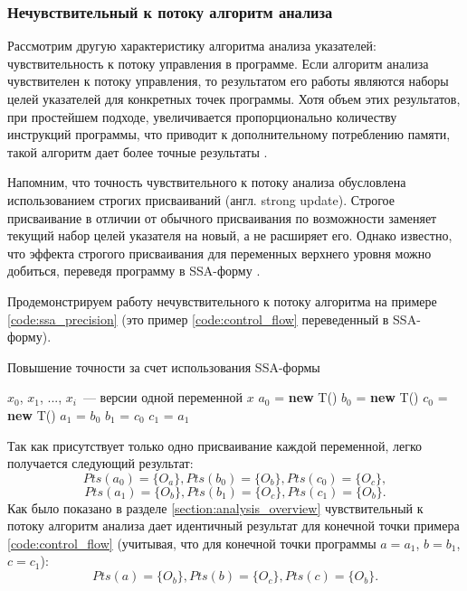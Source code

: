 \documentclass[14pt,titlepage]{extarticle}
\newcommand{\NEW}{\textbf{new }}
\newcommand{\eng}[1]{{\English#1}}
\begin{document}
    \subsubsection{Нечувствительный к потоку алгоритм анализа}
      \label{section:flow_sensetive_analysis}

      Рассмотрим другую характеристику алгоритма анализа указателей:
      чувствительность к потоку управления в программе.
      Если алгоритм анализа чувствителен к потоку управления, то результатом
      его работы являются наборы целей указателей для конкретных точек
      программы.
      Хотя объем этих результатов, при простейшем подходе, увеличивается
      пропорционально количеству инструкций программы, что приводит к
      дополнительному потреблению памяти, такой алгоритм дает более точные
      результаты \cite[с.~57]{hind_pointer_analysis_not_solved_yet}.

      Напомним, что точность чувствительного к потоку анализа обусловлена
      использованием строгих присваиваний (англ. \eng{strong update}).
      Строгое присваивание в отличии от обычного присваивания по возможности
      заменяет текущий набор целей указателя на новый, а не расширяет его.
      Однако известно, что эффекта строгого присваивания для переменных
      верхнего уровня можно добиться, переведя программу в SSA-форму
      \cite{points_to_with_efficient_strong_updates}.

      Продемонстрируем работу нечувствительного к потоку алгоритма на примере
      \ref{code:ssa_precision} (это пример \ref{code:control_flow} переведенный
      в SSA-форму).
      \begin{algorithm}
        \caption{Повышение точности за счет использования SSA-формы}
        \label{code:ssa_precision}
        \begin{algorithmic}[1]
          \REQUIRE $x_0$, $x_1$, ..., $x_i$~--- версии одной переменной $x$
          \STATE $a_0$ = \NEW T()
          \STATE $b_0$ = \NEW T()
          \STATE $c_0$ = \NEW T()
          \STATE $a_1$ = $b_0$
          \STATE $b_1$ = $c_0$
          \STATE $c_1$ = $a_1$
        \end{algorithmic}
      \end{algorithm}

      Так как присутствует только одно присваивание каждой переменной, легко
      получается следующий результат:
      \[Pts(a_0) = \{O_a\}, Pts(b_0) = \{O_b\}, Pts(c_0) = \{O_c\},\]
      \[Pts(a_1) = \{O_b\}, Pts(b_1) = \{O_c\}, Pts(c_1) = \{O_b\}.\]
      Как было показано в разделе \ref{section:analysis_overview}
      чувствительный к
      потоку алгоритм анализа дает идентичный результат для конечной точки
      примера \ref{code:control_flow} (учитывая, что для конечной точки
      программы $a = a_1$, $b = b_1$, $c = c_1$):
      \[Pts(a) = \{O_b\}, Pts(b) = \{O_c\}, Pts(c) = \{O_b\}.\]
\end{document}
